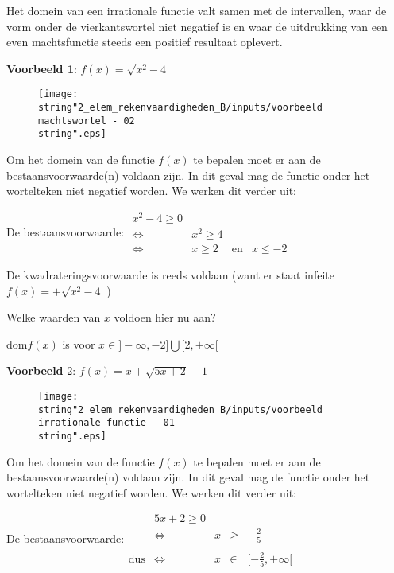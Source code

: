 Het domein van een irrationale functie valt samen met de intervallen,
waar de vorm onder de vierkantswortel niet negatief is en waar de
uitdrukking van een even machtsfunctie steeds een positief resultaat
oplevert.

\medskip{}


\textbf{Voorbeeld 1}: ${\displaystyle f(x)=\sqrt{x^{2}-4}}$ 

\begin{figure}[h]
\centering
\texttt{[image: \\string"2\_elem\_rekenvaardigheden\_B/inputs/voorbeeld machtswortel - 02\\string".eps]}
\end{figure}
\medskip{}


Om het domein van de functie $f(x)$ te bepalen moet er aan de bestaansvoorwaarde(n)
voldaan zijn. In dit geval mag de functie onder het wortelteken niet
negatief worden. We werken dit verder uit:

De bestaansvoorwaarde: $\begin{array}{cccl}
x^{2}-4\geq0\\
\Longleftrightarrow & x^{2}\geq4\\
\Longleftrightarrow & x\geq2 & \textrm{en} & x\leq-2
\end{array}$

De kwadrateringsvoorwaarde is reeds voldaan (want er staat infeite
${\displaystyle f(x)=+\sqrt{x^{2}-4}}$ )

Welke waarden van $x$ voldoen hier nu aan?

${\displaystyle \textrm{dom}f(x)}$ is voor $x\in]-\infty,-2]\bigcup[2,+\infty[$ 

\medskip{}


\textbf{Voorbeeld }2: ${\displaystyle f(x)=x+\sqrt{5x+2}-1}$ 

\begin{figure}
\centering
\texttt{[image: \\string"2\_elem\_rekenvaardigheden\_B/inputs/voorbeeld irrationale functie - 01\\string".eps]}
\end{figure}
\medskip{}


Om het domein van de functie $f(x)$ te bepalen moet er aan de bestaansvoorwaarde(n)
voldaan zijn. In dit geval mag de functie onder het wortelteken niet
negatief worden. We werken dit verder uit:

De bestaansvoorwaarde:${\displaystyle \begin{array}{cclcc}
 & 5x+2\geq0\\
 & \Longleftrightarrow & x & \geq & -\frac{2}{5}\\
\\
\textrm{dus} & \Longleftrightarrow & x & \in & [-\frac{2}{5},+\infty[
\end{array}}$

